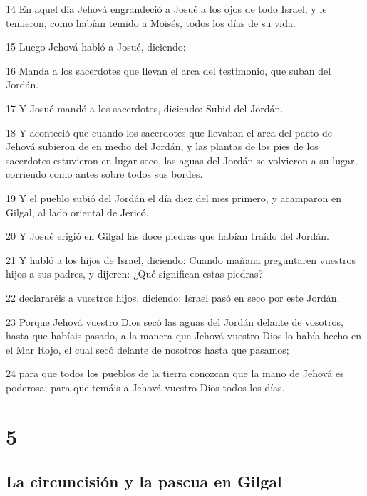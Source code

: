 \par 14 En aquel día Jehová engrandeció a Josué a los ojos de todo Israel; y le temieron, como habían temido a Moisés, todos los días de su vida.
\par 15 Luego Jehová habló a Josué, diciendo:
\par 16 Manda a los sacerdotes que llevan el arca del testimonio, que suban del Jordán.
\par 17 Y Josué mandó a los sacerdotes, diciendo: Subid del Jordán.
\par 18 Y aconteció que cuando los sacerdotes que llevaban el arca del pacto de Jehová subieron de en medio del Jordán, y las plantas de los pies de los sacerdotes estuvieron en lugar seco, las aguas del Jordán se volvieron a su lugar, corriendo como antes sobre todos sus bordes.
\par 19 Y el pueblo subió del Jordán el día diez del mes primero, y acamparon en Gilgal, al lado oriental de Jericó.
\par 20 Y Josué erigió en Gilgal las doce piedras que habían traído del Jordán.
\par 21 Y habló a los hijos de Israel, diciendo: Cuando mañana preguntaren vuestros hijos a sus padres, y dijeren: ¿Qué significan estas piedras?
\par 22 declararéis a vuestros hijos, diciendo: Israel pasó en seco por este Jordán.
\par 23 Porque Jehová vuestro Dios secó las aguas del Jordán delante de vosotros, hasta que habíais pasado, a la manera que Jehová vuestro Dios lo había hecho en el Mar Rojo, el cual secó delante de nosotros hasta que pasamos;
\par 24 para que todos los pueblos de la tierra conozcan que la mano de Jehová es poderosa; para que temáis a Jehová vuestro Dios todos los días.

\chapter{5}

\section*{La circuncisión y la pascua en Gilgal}


